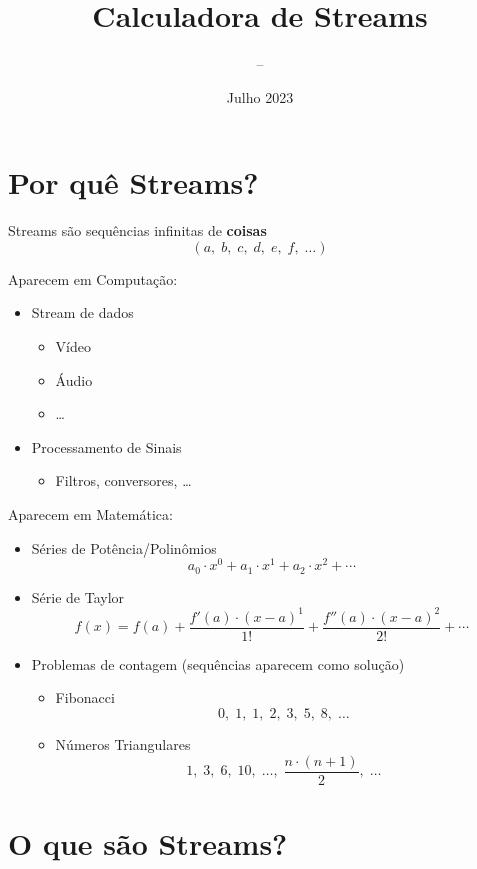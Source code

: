 \documentclass{article}
\title{Calculadora de Streams}
\author{\hashi{} -- \dre{}
}
\date{Julho 2023}
\newcommand{\coisa}[1]{\textbf{coisa#1}}
\begin{document}
\maketitle

\section{Por quê Streams?}

Streams são sequências infinitas de \coisa{s}
\[
    (a, \; b, \; c, \; d, \; e, \; f, \; \dots)
\]

Aparecem em Computação:
\begin{itemize}
    \item Stream de dados
    \begin{itemize}
        \item Vídeo
        \item Áudio
        \item \dots
    \end{itemize}

    \item Processamento de Sinais
    \begin{itemize}
        \item Filtros, conversores, \dots
    \end{itemize}
\end{itemize}

Aparecem em Matemática:
\begin{itemize}
    \item Séries de Potência/Polinômios
    \[
        a_0 \cdot x^0 + a_1 \cdot x^1 + a_2 \cdot x^2 + \cdots
    \]
    \item Série de Taylor
    \[
        f(x) =
        f(a)
        + \frac{f'(a) \cdot (x-a)^1}{1!}
        + \frac{f''(a) \cdot (x-a)^2}{2!}
        + \cdots
    \]
    \item Problemas de contagem (sequências aparecem como solução)
    \begin{itemize}
        \item Fibonacci
        \[
            0, \; 1, \; 1, \; 2, \; 3, \; 5, \; 8, \; \dots
        \]
        \item Números Triangulares
        \[
            1, \; 3, \; 6, \; 10, \; \dots, \; \frac{n \cdot (n+1)}{2}, \; \dots
        \]
    \end{itemize}
\end{itemize}

\section{O que são Streams?}
\end{document}
